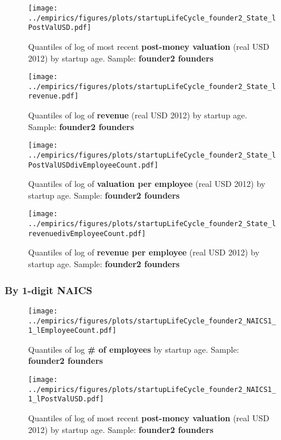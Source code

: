 \documentclass[12pt,english]{article}
\theoremstyle{remark}
\let\Oldsubsubsection\subsubsection
\renewcommand{\subsubsection}{\FloatBarrier\Oldsubsubsection}
\begin{document}
\begin{figure}[!htb]
	\centering
	\texttt{[image: ../empirics/figures/plots/startupLifeCycle\_founder2\_State\_lPostValUSD.pdf]}
	\caption{Quantiles of log of most recent \textbf{post-money valuation} (real USD 2012) by startup age. 
		Sample: \textbf{founder2 founders}}
\end{figure}

\begin{figure}[!htb]
	\centering
	\texttt{[image: ../empirics/figures/plots/startupLifeCycle\_founder2\_State\_lrevenue.pdf]}
	\caption{Quantiles of log of \textbf{revenue} (real USD 2012) by startup age. 
		Sample: \textbf{founder2 founders}}
\end{figure}

\begin{figure}[!htb]
	\centering
	\texttt{[image: ../empirics/figures/plots/startupLifeCycle\_founder2\_State\_lPostValUSDdivEmployeeCount.pdf]}
	\caption{Quantiles of log of \textbf{valuation per employee} (real USD 2012) by startup age. 
		Sample: \textbf{founder2 founders}}
\end{figure}

\begin{figure}[!htb]
	\centering
	\texttt{[image: ../empirics/figures/plots/startupLifeCycle\_founder2\_State\_lrevenuedivEmployeeCount.pdf]}
	\caption{Quantiles of log of \textbf{revenue per employee} (real USD 2012) by startup age. 
		Sample: \textbf{founder2 founders}}
\end{figure}

\subsubsection{By 1-digit NAICS}

\begin{figure}[!htb]
	\centering
	\texttt{[image: ../empirics/figures/plots/startupLifeCycle\_founder2\_NAICS1\_1\_lEmployeeCount.pdf]}
	\caption{Quantiles of log \textbf{\# of employees} by startup age. 
		Sample: \textbf{founder2 founders}}
\end{figure}

\begin{figure}[!htb]
	\centering
	\texttt{[image: ../empirics/figures/plots/startupLifeCycle\_founder2\_NAICS1\_1\_lPostValUSD.pdf]}
	\caption{Quantiles of log of most recent \textbf{post-money valuation} (real USD 2012) by startup age. 
		Sample: \textbf{founder2 founders}}
\end{figure}
\end{document}
